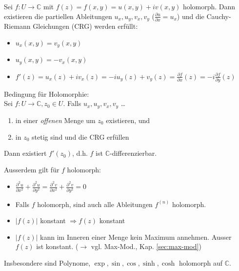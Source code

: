 \documentclass[8pt, a4paper, landscape, fleqn]{scrartcl}
\def\C{\mathbb{C}}
\newcommand{\blue}[1]{\textcolor{ethblue}{#1}}
\begin{document}
\begin{multicols*}{3}
		Sei $f: U \to \C$ mit $f(z) = f(x, y) = u(x, y) + i v(x, y)$ holomorph. Dann existieren die partiellen Ableitungen $u_x, u_y, v_x, v_y$ ($\frac{\partial u}{\partial x} = u_x$) und die \blue{Cauchy-Riemann Gleichungen (CRG)} werden erfüllt:
		\begin{multicols}{2}
    		\begin{itemize}
    			\item $ u_x(x, y) = v_y(x, y)$
    			\item $u_y(x, y) = -v_x(x, y)$
    		\end{itemize}
    	    \end{multicols}
    	    \begin{itemize}
		        \item $f'(z) = u_x(z)+iv_x(z) = -iu_y(z)+v_y(z) = \frac{\partial f}{\partial x}(z) = -i \frac{\partial f}{\partial y}(z)$
		    \end{itemize}
			\setlength{\columnseprule}{0.5pt}
		
		Bedingung für Holomorphie: \\ Sei $f: U \to \C, z_0 \in U$. Falls $u_x, u_y, v_x, v_y$ \dots
		\begin{enumerate}
		    \item  in einer \textit{offenen} Menge um $z_0$ existieren, und
		    \item  in $z_0$ stetig sind und die CRG erfüllen
		\end{enumerate} Dann existiert $f'(z_0)$, d.h. $f$ ist $\C$-differenzierbar.  
		
		\vspace{5pt}
		Ausserdem gilt für $f$ holomorph: 
		\begin{itemize}
		    \item $\frac{\partial^2 u}{\partial x^2} + \frac{\partial^2 u}{\partial y^2} = \frac{\partial^2 v}{\partial x^2} + \frac{\partial^2 v}{\partial y^2} = 0$
		    \item Falls $f$ holomorph, sind auch alle Ableitungen $f^{(n)}$ holomorph.
		    \item $\vert f(z) \vert$ konstant $\Rightarrow f(z)$ konstant
		    \item $|f(z)|$ kann im Inneren einer Menge kein Maximum annehmen. Ausser $f(z)$ ist konstant. ($\rightarrow$ vgl. Max-Mod., Kap. \ref{sec:max-mod})
		\end{itemize}
        Insbesondere sind Polynome, $\exp, \sin, \cos, \sinh, \cosh$ holomorph auf $\C$.
        

\end{multicols*}
\end{document}
